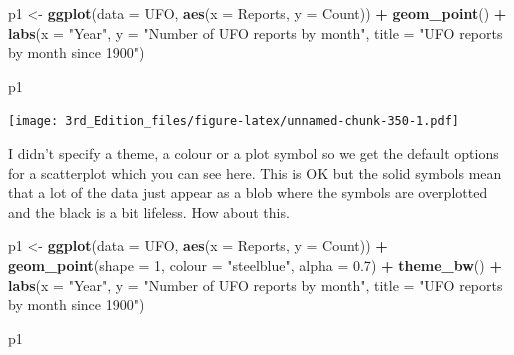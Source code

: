 \documentclass[
]{book}
\newenvironment{Shaded}{\begin{snugshade}}{\end{snugshade}}
\newcommand{\DataTypeTok}[1]{\textcolor[rgb]{0.13,0.29,0.53}{#1}}
\newcommand{\DecValTok}[1]{\textcolor[rgb]{0.00,0.00,0.81}{#1}}
\newcommand{\FloatTok}[1]{\textcolor[rgb]{0.00,0.00,0.81}{#1}}
\newcommand{\KeywordTok}[1]{\textcolor[rgb]{0.13,0.29,0.53}{\textbf{#1}}}
\newcommand{\NormalTok}[1]{#1}
\newcommand{\OperatorTok}[1]{\textcolor[rgb]{0.81,0.36,0.00}{\textbf{#1}}}
\newcommand{\StringTok}[1]{\textcolor[rgb]{0.31,0.60,0.02}{#1}}
\begin{document}
\begin{Shaded}
\begin{Highlighting}[]
\NormalTok{p1 <-}\StringTok{ }\KeywordTok{ggplot}\NormalTok{(}\DataTypeTok{data =}\NormalTok{ UFO, }\KeywordTok{aes}\NormalTok{(}\DataTypeTok{x =}\NormalTok{ Reports, }
                             \DataTypeTok{y =}\NormalTok{ Count)) }\OperatorTok{+}
\StringTok{               }\KeywordTok{geom_point}\NormalTok{() }\OperatorTok{+}
\StringTok{               }\KeywordTok{labs}\NormalTok{(}\DataTypeTok{x =} \StringTok{"Year"}\NormalTok{, }
                    \DataTypeTok{y =} \StringTok{"Number of UFO reports by month"}\NormalTok{, }
                    \DataTypeTok{title =} \StringTok{"UFO reports by month since 1900"}\NormalTok{)}

\NormalTok{p1}
\end{Highlighting}
\end{Shaded}

\texttt{[image: 3rd\_Edition\_files/figure-latex/unnamed-chunk-350-1.pdf]}

I didn't specify a theme, a colour or a plot symbol so we get the default options for a scatterplot which you can see here. This is OK but the solid symbols mean that a lot of the data just appear as a blob where the symbols are overplotted and the black is a bit lifeless. How about this.

\begin{Shaded}
\begin{Highlighting}[]
\NormalTok{p1 <-}\StringTok{ }\KeywordTok{ggplot}\NormalTok{(}\DataTypeTok{data =}\NormalTok{ UFO, }\KeywordTok{aes}\NormalTok{(}\DataTypeTok{x =}\NormalTok{ Reports, }
                             \DataTypeTok{y =}\NormalTok{ Count)) }\OperatorTok{+}
\StringTok{               }\KeywordTok{geom_point}\NormalTok{(}\DataTypeTok{shape =} \DecValTok{1}\NormalTok{, }
                          \DataTypeTok{colour =} \StringTok{"steelblue"}\NormalTok{, }
                          \DataTypeTok{alpha =} \FloatTok{0.7}\NormalTok{) }\OperatorTok{+}
\StringTok{               }\KeywordTok{theme_bw}\NormalTok{() }\OperatorTok{+}
\StringTok{               }\KeywordTok{labs}\NormalTok{(}\DataTypeTok{x =} \StringTok{"Year"}\NormalTok{, }
                    \DataTypeTok{y =} \StringTok{"Number of UFO reports by month"}\NormalTok{, }
                    \DataTypeTok{title =} \StringTok{"UFO reports by month since 1900"}\NormalTok{)}

\NormalTok{p1}
\end{Highlighting}
\end{Shaded}
\end{document}
